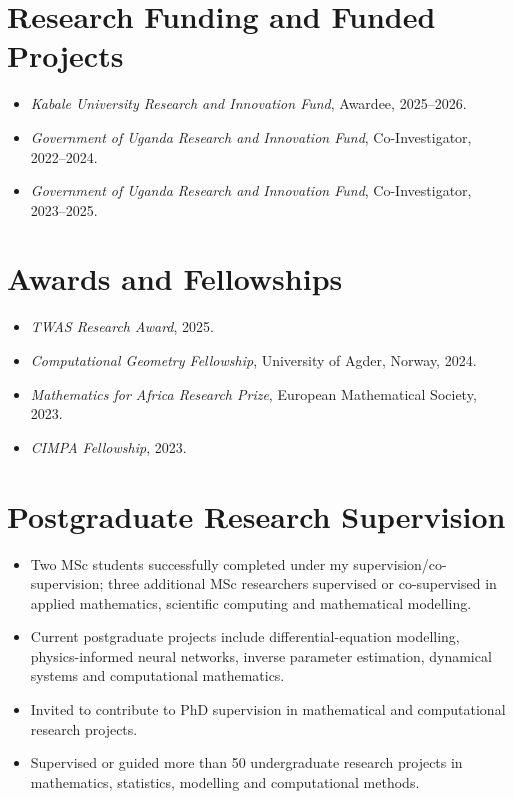 \documentclass[11pt,a4paper]{article}
\begin{document}
\section{Research Funding and Funded Projects}

\begin{itemize}

\item
\textit{Kabale University Research and Innovation Fund},
Awardee, 2025--2026.

\item
\textit{Government of Uganda Research and Innovation Fund},
Co-Investigator, 2022--2024.

\item
\textit{Government of Uganda Research and Innovation Fund},
Co-Investigator, 2023--2025.


\end{itemize}

\section{Awards and Fellowships}

\begin{itemize}

\item
\textit{TWAS Research Award}, 2025.

\item
\textit{Computational Geometry Fellowship},
University of Agder, Norway, 2024.

\item
\textit{Mathematics for Africa Research Prize},
European Mathematical Society, 2023.

\item
\textit{CIMPA Fellowship}, 2023.

\end{itemize}

\section{Postgraduate Research Supervision}

\begin{itemize}
\item Two MSc students successfully completed under my supervision/co-supervision;
three additional MSc researchers supervised or co-supervised in applied
mathematics, scientific computing and mathematical modelling.

\item Current postgraduate projects include differential-equation modelling,
physics-informed neural networks, inverse parameter estimation,
dynamical systems and computational mathematics.

\item Invited to contribute to PhD supervision in mathematical and
computational research projects.

\item Supervised or guided more than 50 undergraduate research projects in
mathematics, statistics, modelling and computational methods.
\end{itemize}
\end{document}
